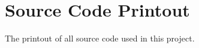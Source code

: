 \documentclass[12pt]{article}  %
\theoremstyle{definition}
\theoremstyle{remark}
\begin{document}
\appendix
\section{Source Code Printout}
The printout of all source code used in this project.




%
%
%

% 
%


%




\end{document}
